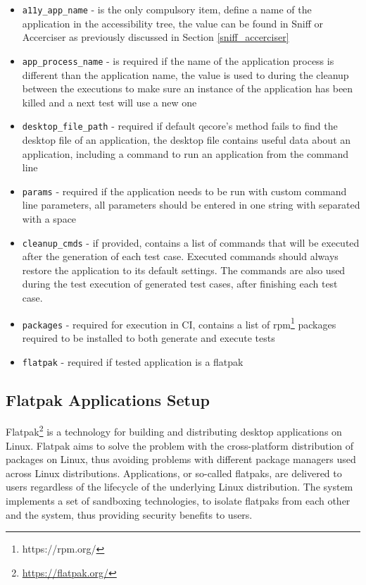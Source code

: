 \begin{itemize}
    \item \texttt{a11y\_app\_name} - is the only compulsory item, define a name of the application in the accessibility tree, the value can be found in Sniff or Accerciser as previously discussed in Section \ref{sniff_accerciser}
     \item \texttt{app\_process\_name} - is required if the name of the application process is different than the application name, the value is used to during the cleanup between the executions to make sure an instance of the application has been killed and a next test will use a new one
     \item \texttt{desktop\_file\_path} - required if default qecore's method fails to find the desktop file of an application, the desktop file contains useful data about an application, including a command to run an application from the command line
     \item \texttt{params} - required if the application needs to be run with custom command line parameters, all parameters should be entered in one string with separated with a space
     \item \texttt{cleanup\_cmds} - if provided, contains a list of commands that will be executed after the generation of each test case. Executed commands should always restore the application to its default settings. The commands are also used during the test execution of generated test cases, after finishing each test case. 
     \item \texttt{packages} - required for execution in CI, contains a list of rpm\footnote{https://rpm.org/} packages required to be installed to both generate and execute tests
     \item \texttt{flatpak} - required if tested application is a flatpak
\end{itemize}

\subsection{Flatpak Applications Setup}
Flatpak\footnote{\url{https://flatpak.org/}} is a technology for building and distributing desktop applications on Linux. Flatpak aims to solve the problem with the cross-platform distribution of packages on Linux, thus avoiding problems with different package managers used across Linux distributions. Applications, or so-called flatpaks, are delivered to users regardless of the lifecycle of the underlying Linux distribution. The system implements a set of sandboxing technologies, to isolate flatpaks from each other and the system, thus providing security benefits to users.\cite{flatpak}

